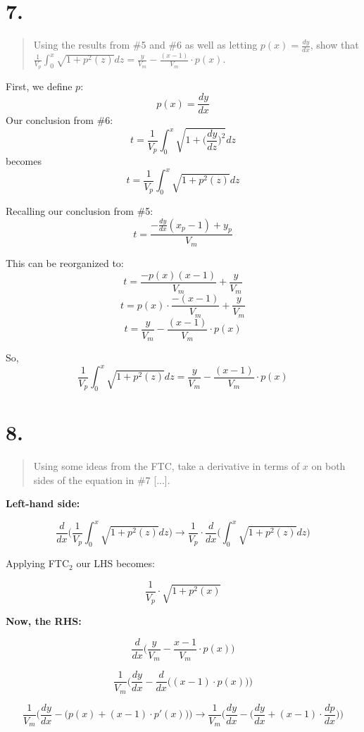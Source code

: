 \documentclass[11pt]{report}
\begin{document}
\section*{7.}

\begin{quote}
	Using the results from \#5 and \#6 as well as letting
	$p(x) = \frac{dy}{dx}$, show that
	$
	\frac{1}{V_p} \int_0^x \sqrt{1 + p^2(z)} dz
	=
	\frac{y}{V_m}
	- \frac {(x-1)} {V_m} \cdot p(x)$.
\end{quote}

First, we define $p$:
$$p(x) = \frac{dy}{dx}$$
Our conclusion from \#6:
$$ t = \frac{1}{V_p} \int_0^x \sqrt{1 + \Big(\frac{dy}{dz}\Big)^2} dz $$
becomes
$$ t = \frac{1}{V_p} \int_0^x \sqrt{1 + p^2(z)} dz $$

Recalling our conclusion from \#5:
$$ t = \frac
	{-\frac{dy}{dx}(x_p - 1) + y_p}
	{V_m}
$$

This can be reorganized to:
$$ t = \frac{-p(x)(x - 1)}{V_m}
	+
	\frac{y}{V_m}
$$
$$ t = p(x) \cdot \frac{-(x - 1)}{V_m}
	+
	\frac{y}{V_m}
$$
$$ t = \frac{y}{V_m} -  \frac {(x - 1)}{V_m} \cdot p(x) $$

So,
$$
\frac{1}{V_p} \int_0^x \sqrt{1 + p^2(z)} dz
=
\frac{y}{V_m} -  \frac{(x - 1)}{V_m} \cdot p(x)
$$

\section*{8.}

\begin{quote}
	Using some ideas from the FTC, take a derivative in terms of $x$ on both sides of the equation in \#7 [...].
\end{quote}


\textbf{Left-hand side:}

$$
\frac{d}{dx}\Big(\frac{1}{V_p} \int_0^x \sqrt{1 + p^2(z)} dz\Big)
\rightarrow
\frac{1}{V_p} \cdot \frac{d}{dx}\Big(\int_0^x \sqrt{1 + p^2(z)} dz\Big)
$$

Applying FTC$_2$ our LHS becomes:

$$
\frac{1}{V_p} \cdot \sqrt{1 + p^2(x)}
$$

\textbf{Now, the RHS:}

$$
\frac{d}{dx}
\Big(
\frac{y}{V_m} -  \frac{x-1}{V_m} \cdot p(x)
\Big)
$$

$$
\frac{1}{V_m}
\Biggr(
	\frac{dy}{dx}
	-
	\frac{d}{dx}
	\Big(
	(x - 1) \cdot p(x)
	\Big)
\Biggr)
$$

$$
\frac{1}{V_m}
\Biggr(
	\frac{dy}{dx}
	-
	\Big(
	p(x) + (x-1) \cdot p'(x)
	\Big)
\Biggr)
\rightarrow
\frac{1}{V_m}
\Biggr(
	\frac{dy}{dx}
	-
	\Big(
	\frac{dy}{dx} + (x-1) \cdot \frac{dp}{dx}
	\Big)
\Biggr)
$$
\end{document}
